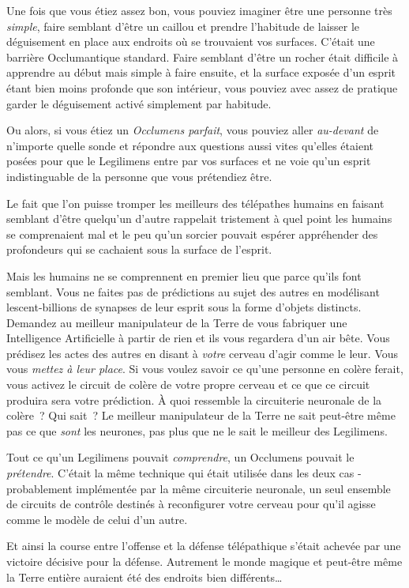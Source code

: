 Une fois que vous étiez assez bon, vous pouviez imaginer être une personne très \emph{simple}, faire semblant d'être un caillou et prendre l'habitude de laisser le déguisement en place aux endroits où se trouvaient vos surfaces. C'était une barrière Occlumantique standard. Faire semblant d'être un rocher était difficile à apprendre au début mais simple à faire ensuite, et la surface exposée d'un esprit étant bien moins profonde que son intérieur, vous pouviez avec assez de pratique garder le déguisement activé simplement par habitude.

Ou alors, si vous étiez un \emph{Occlumens parfait}, vous pouviez aller \emph{au-devant} de n'importe quelle sonde et répondre aux questions aussi vites qu'elles étaient posées pour que le Legilimens entre par vos surfaces et ne voie qu'un esprit indistinguable de la personne que vous prétendiez être.

Le fait que l'on puisse tromper les meilleurs des télépathes humains en faisant semblant d'être quelqu'un d'autre rappelait tristement à quel point les humains se comprenaient mal et le peu qu'un sorcier pouvait espérer appréhender des profondeurs qui se cachaient sous la surface de l'esprit.

Mais les humains ne se comprennent en premier lieu que parce qu'ils font semblant. Vous ne faites pas de prédictions au sujet des autres en modélisant lescent-billions de synapses de leur esprit sous la forme d'objets distincts. Demandez au meilleur manipulateur de la Terre de vous fabriquer une Intelligence Artificielle à partir de rien et ils vous regardera d'un air bête. Vous prédisez les actes des autres en disant à \emph{votre} cerveau d'agir comme le leur. Vous vous \emph{mettez à leur place}. Si vous voulez savoir ce qu'une personne en colère ferait, vous activez le circuit de colère de votre propre cerveau et ce que ce circuit produira sera votre prédiction. À quoi ressemble la circuiterie neuronale de la colère~? Qui sait~? Le meilleur manipulateur de la Terre ne sait peut-être même pas ce que \emph{sont} les neurones, pas plus que ne le sait le meilleur des Legilimens.

Tout ce qu'un Legilimens pouvait \emph{comprendre}, un Occlumens pouvait le \emph{prétendre}. C'était la même technique qui était utilisée dans les deux cas - probablement implémentée par la même circuiterie neuronale, un seul ensemble de circuits de contrôle destinés à reconfigurer votre cerveau pour qu'il agisse comme le modèle de celui d'un autre.

Et ainsi la course entre l'offense et la défense télépathique s'était achevée par une victoire décisive pour la défense. Autrement le monde magique et peut-être même la Terre entière auraient été des endroits bien différents…

